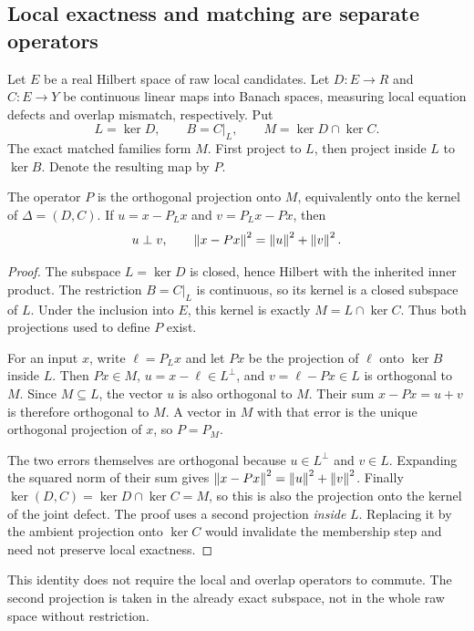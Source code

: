 \label{KS:sec:quantitative}
\subsection{Local exactness and matching are separate operators}
Let \(E\) be a real Hilbert space of raw local candidates. Let \(D:E\to R\) and \(C:E\to Y\) be continuous linear maps into Banach spaces, measuring local equation defects and overlap mismatch, respectively. Put
\[
 L=\ker D,\qquad B=C|_L,
 \qquad M=\ker D\cap\ker C.
\]
The exact matched families form \(M\). First project to \(L\), then project inside \(L\) to \(\ker B\). Denote the resulting map by \(P\).

\begin{KStheorem}\label{KS:KS46}
The operator \(P\) is the orthogonal projection onto \(M\), equivalently onto the kernel of \(\Delta=(D,C)\). If \(u=x-P_Lx\) and \(v=P_Lx-Px\), then
\[
 u\perp v,\qquad\left\lVert x-Px\right\rVert^2=\left\lVert u\right\rVert^2+\left\lVert v\right\rVert^2.
\]
\end{KStheorem}
\begin{proof}
The subspace \(L=\ker D\) is closed, hence Hilbert with the inherited inner product. The restriction \(B=C|_L\) is continuous, so its kernel is a closed subspace of \(L\). Under the inclusion into \(E\), this kernel is exactly \(M=L\cap\ker C\). Thus both projections used to define \(P\) exist.

For an input \(x\), write \(\ell=P_Lx\) and let \(Px\) be the projection of \(\ell\) onto \(\ker B\) inside \(L\). Then \(Px\in M\), \(u=x-\ell\in L^\perp\), and \(v=\ell-Px\in L\) is orthogonal to \(M\). Since \(M\subseteq L\), the vector \(u\) is also orthogonal to \(M\). Their sum \(x-Px=u+v\) is therefore orthogonal to \(M\). A vector in \(M\) with that error is the unique orthogonal projection of \(x\), so \(P=P_M\).

The two errors themselves are orthogonal because \(u\in L^\perp\) and \(v\in L\). Expanding the squared norm of their sum gives \(\left\lVert x-Px\right\rVert^2=\left\lVert u\right\rVert^2+\left\lVert v\right\rVert^2\). Finally \(\ker(D,C)=\ker D\cap\ker C=M\), so this is also the projection onto the kernel of the joint defect. The proof uses a second projection \emph{inside} \(L\). Replacing it by the ambient projection onto \(\ker C\) would invalidate the membership step and need not preserve local exactness.
\end{proof}
This identity does not require the local and overlap operators to commute. The second projection is taken in the already exact subspace, not in the whole raw space without restriction.

